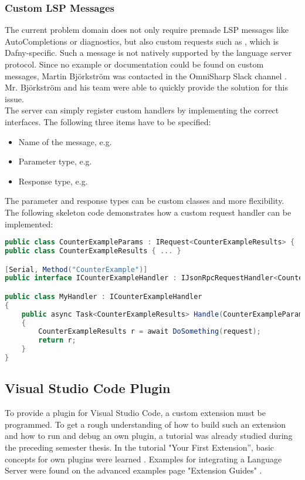 \subsubsection{Custom LSP Messages}
\label{chapter:customlspmsg}
The current problem domain does not only require premade LSP messages like AutoCompletions or diagnostics, but also custom requests such as , which is Dafny-specific.
Such a message is not natively supported by the language server protocol.
Since no example or documentation could be found on custom messages, Martin Bj\"orkstr\"om was contacted in the OmniSharp Slack channel \cite{omnisharpslack}.
Mr. Bj\"orkstr\"om and his team were able to quickly provide the solution for this issue.\\

The server can simply register custom handlers by implementing the correct interfaces.
The following three items have to be specified:
\begin{itemize}
    \item Name of the message, e.g. 
    \item Parameter type, e.g. 
    \item Response type, e.g. 
\end{itemize}


The parameter and response types can be custom classes and more flexibility.
The following skeleton code demonstrates how a custom request handler can be implemented:

\begin{lstlisting}[language=csharp, caption={LSP Handler Implementation for CounterExample}, captionpos=b, label={lst:lspcustomhandler}]
public class CounterExampleParams : IRequest<CounterExampleResults> { ... }
public class CounterExampleResults { ... }

[Serial, Method("CounterExample")]
public interface ICounterExampleHandler : IJsonRpcRequestHandler<CounterExampleParams, CounterExampleResults> { }

public class MyHandler : ICounterExampleHandler
{
    public async Task<CounterExampleResults> Handle(CounterExampleParams request, CancellationToken c)
    {
        CounterExampleResults r = await DoSomething(request);
        return r;
    }
}
\end{lstlisting}


\subsection{Visual Studio Code Plugin}
To provide a plugin for Visual Studio Code, a custom extension must be programmed.
To get a rough understanding of how to build such an extension
and how to run and debug an own plugin, a tutorial was already studied during the preceding semester thesis.
In the tutorial "Your First Extension”, basic concepts for own plugins were learned \cite{vscode-first-extension}.
Examples for integrating a Language Server were found on the advanced examples page "Extension Guides" \cite{vscode-extensions}. \\

